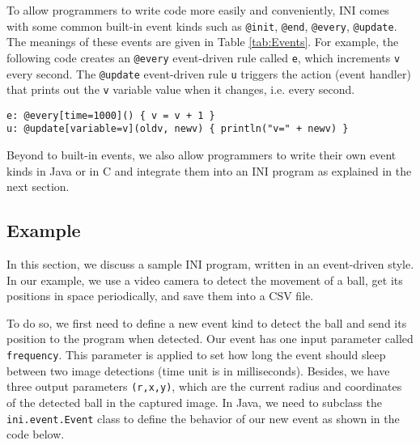 \documentclass[runningheads,a4paper]{llncs}
\begin{document}
To allow programmers to write code more easily and conveniently, INI comes with some common built-in event kinds such as \texttt{@init}, \texttt{@end}, \texttt{@every}, \texttt{@update}. The meanings of these events are given in Table \ref{tab:Events}. For example, the following code creates an \texttt{@every} event-driven rule called \texttt{e}, which increments \texttt{v} every second. The \texttt{@update} event-driven rule \texttt{u} triggers the action (event handler) that prints out the \texttt{v} variable value when it changes, i.e. every second.

\begin{lstlisting}[numbers=none]
e: @every[time=1000]() { v = v + 1 }
u: @update[variable=v](oldv, newv) { println("v=" + newv) }
\end{lstlisting}

Beyond to built-in events, we also allow programmers to write their own event kinds in Java or in C and integrate them into an INI program as explained in the next section.


\subsection{Example}

In this section, we discuss a sample INI program, written in an event-driven style. In our example, we use a video camera to detect the movement of a ball, get its positions in space periodically, and save them into a CSV file.

To do so, we first need to define a new event kind to detect the ball and send its position to the program when detected. Our event has one input parameter called \texttt{frequency}. This parameter is applied to set how long the event should sleep between two image detections (time unit is in milliseconds). Besides, we have three output parameters \texttt{(r,x,y)}, which are the current radius and coordinates of the detected ball in the captured image. In Java, we need to subclass the \texttt{ini.event.Event} class to define the behavior of our new event as shown in the code below.
\end{document}
